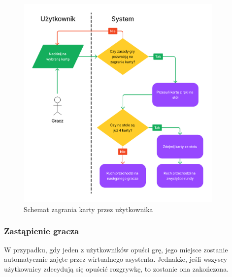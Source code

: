 \begin{figure}[hbt!]
  \centering
  \includegraphics[width=0.9\textwidth]{img/schematy/play_card.png}
  \caption{Schemat zagrania karty przez użytkownika}
\end{figure}

\FloatBarrier


\subsubsection{Zastąpienie gracza}
W przypadku, gdy jeden z użytkowników opuści grę, jego miejsce zostanie automatycznie
zajęte przez wirtualnego asystenta. Jednakże, jeśli wszyscy użytkownicy
zdecydują się opuścić rozgrywkę, to zostanie ona zakończona.




